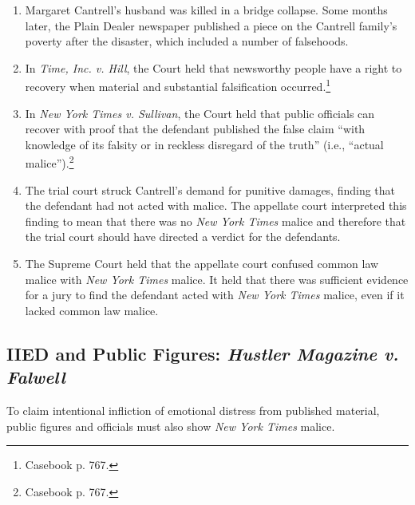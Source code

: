 \begin{enumerate}
    \item Margaret Cantrell's husband was killed in a bridge collapse. Some 
    months later, the Plain Dealer newspaper published a piece on the Cantrell 
    family's poverty after the disaster, which included a number of 
    falsehoods.
    \item In \emph{Time, Inc. v. Hill}, the Court held that newsworthy people 
    have a right to recovery when material and substantial falsification 
    occurred.\footnote{Casebook p. 767.}
    \item In \emph{New York Times v. Sullivan}, the Court held that public 
    officials can recover with proof that the defendant published the 
    false claim ``with knowledge of its falsity or in reckless disregard of 
    the truth'' (i.e., ``actual malice'').\footnote{Casebook p. 767.}
    \item The trial court struck Cantrell's demand for punitive damages, 
    finding that the defendant had not acted with malice. The appellate court 
    interpreted this finding to mean that there was no \emph{New York Times} 
    malice and therefore that the trial court should have directed a verdict 
    for the defendants.
    \item The Supreme Court held that the appellate court confused common law 
    malice with \emph{New York Times} malice. It held that there was 
    sufficient evidence for a jury to find the defendant acted with \emph{New 
    York Times} malice, even if it lacked common law malice.
\end{enumerate}

\subsection{IIED and Public Figures: \emph{Hustler Magazine v. Falwell}}

To claim intentional infliction of emotional distress from published material, 
public figures and officials must also show \emph{New York Times} malice.

